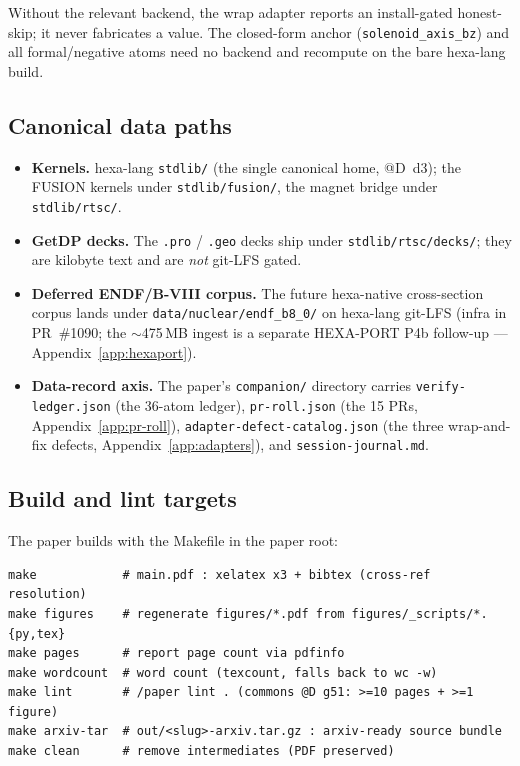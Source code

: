 Without the relevant backend, the wrap adapter reports an install-gated
honest-skip; it never fabricates a value. The closed-form anchor
(\verb|solenoid_axis_bz|) and all formal/negative atoms need no backend
and recompute on the bare hexa-lang build.

\subsection{Canonical data paths}
\label{app:repro:data}

\begin{itemize}\itemsep0.2em
\item \textbf{Kernels.} hexa-lang \texttt{stdlib/} (the single
canonical home, @D~d3); the FUSION kernels under
\texttt{stdlib/fusion/}, the magnet bridge under \texttt{stdlib/rtsc/}.
\item \textbf{GetDP decks.} The \texttt{.pro} / \texttt{.geo} decks
ship under \texttt{stdlib/rtsc/decks/}; they are kilobyte text and are
\emph{not} git-LFS gated.
\item \textbf{Deferred ENDF/B-VIII corpus.} The future hexa-native
cross-section corpus lands under \texttt{data/nuclear/endf\_b8\_0/} on
hexa-lang git-LFS (infra in PR~\#1090; the $\sim$475\,MB ingest is a
separate HEXA-PORT P4b follow-up --- Appendix~\ref{app:hexaport}).
\item \textbf{Data-record axis.} The paper's \texttt{companion/}
directory carries \texttt{verify-ledger.json} (the 36-atom ledger),
\texttt{pr-roll.json} (the 15 PRs, Appendix~\ref{app:pr-roll}),
\texttt{adapter-defect-catalog.json} (the three wrap-and-fix defects,
Appendix~\ref{app:adapters}), and \texttt{session-journal.md}.
\end{itemize}

\subsection{Build and lint targets}
\label{app:repro:make}

The paper builds with the Makefile in the paper root:

\begin{lstlisting}
make            # main.pdf : xelatex x3 + bibtex (cross-ref resolution)
make figures    # regenerate figures/*.pdf from figures/_scripts/*.{py,tex}
make pages      # report page count via pdfinfo
make wordcount  # word count (texcount, falls back to wc -w)
make lint       # /paper lint . (commons @D g51: >=10 pages + >=1 figure)
make arxiv-tar  # out/<slug>-arxiv.tar.gz : arxiv-ready source bundle
make clean      # remove intermediates (PDF preserved)
\end{lstlisting}

